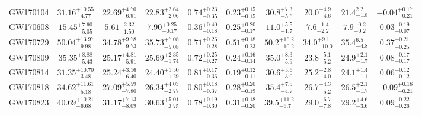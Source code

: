 \begin{table}
\begin{ruledtabular}
\begin{tabular}{cccccccccc}
\vspace{1.0 mm}
GW170104 & $31.16_{-4.77}^{+10.55}$& $22.69_{-6.91}^{+4.70}$& $22.83_{-2.06}^{+2.64}$& $0.74_{-0.35}^{+0.23}$& $0.23_{-0.15}^{+0.15}$&  $30.8_{-5.6}^{+7.3}$             & $20.0_{-4.6}^{+4.9}$              & $21.4_{-1.8}^{2.2}$                       &  $-0.04_{-0.21}^{+0.17}$             \\
\vspace{1.0 mm}
GW170608 & $15.45_{-5.05}^{+7.60}$& $5.61_{-1.50}^{+2.32}$& $7.90_{-0.17}^{+0.25}$& $0.36_{-0.18}^{+0.40}$& $0.25_{-0.17}^{+0.20}$&  $11.0_{-1.7}^{+5.5}$             & $7.6_{-2.2}^{+1.4}$              &      $7.9_{-0.2}^{+0.2}$                  &    $0.03_{-0.07}^{+0.19}$           \\
\vspace{1.0 mm}
GW170729 & $50.04_{-9.98}^{+13.97}$& $34.78_{-9.73}^{+9.78}$& $35.73_{-5.08}^{+7.08}$& $0.71_{-0.28}^{+0.26}$& $0.51_{-0.23}^{+0.18}$&  $50.2_{-10.2}^{+16.2}$             &  $34.0_{-10.0}^{+9.1}$             & $35.4_{-4.8}^{6.5}$                      &  $0.37_{-0.25}^{+0.21}$              \\
\vspace{1.0 mm}
GW170809 & $35.35_{-5.43}^{+8.88}$& $25.17_{-5.91}^{+4.81}$& $25.69_{-1.74}^{+2.35}$& $0.72_{-0.27}^{+0.25}$& $0.24_{-0.14}^{+0.16}$&    $35.0_{-5.9}^{+8.3}$           &                 $23.8_{-5.2}^{+5.1}$                     &  $24.9_{-1.7}^{+2.1}$   & $0.08_{-0.17}^{+0.17}$             \\
\vspace{1.0 mm}
GW170814 & $31.35_{-3.48}^{+10.70}$& $25.24_{-6.40}^{+3.16}$& $24.40_{-1.29}^{+1.50}$& $0.81_{-0.36}^{+0.17}$& $0.19_{-0.11}^{+0.12}$&  $30.6_{-3.0}^{+5.6}$             &               $25.2_{-4.0}^{+2.8}$&   $24.1_{-1.1}^{+1.4}$                    &   $0.06_{-0.12}^{+0.12}$           \\
\vspace{1.0 mm}
GW170818 &$34.62_{-5.18}^{+11.61}$& $27.09_{-7.80}^{+5.59}$& $26.34_{-2.77}^{+4.03}$& $0.80_{-0.37}^{+0.18}$& $0.28_{-0.19}^{+0.20}$&   $35.4_{-4.7}^{+7.5}$            &               $26.7_{-5.2}^{+4.3}$& $26.5_{-1.7}^{+2.1}$                      &  $-0.09_{-0.21}^{+0.18}$            \\
\vspace{1.0 mm}
GW170823 & $40.69_{-6.68}^{+10.21}$& $31.17_{-8.09}^{+7.13}$& $30.63_{-3.75}^{+5.01}$& $0.78_{-0.30}^{+0.19}$& $0.31_{-0.20}^{+0.18}$&  $39.5_{-6.7}^{+11.2}$             &               $29.0_{-7.8}^{+6.7}$&   $29.2_{-3.6}^{+4.6}$                    &    $0.09_{-0.26}^{+0.22}$          \\
\end{tabular}
\fi


\end{ruledtabular}
\end{table}
